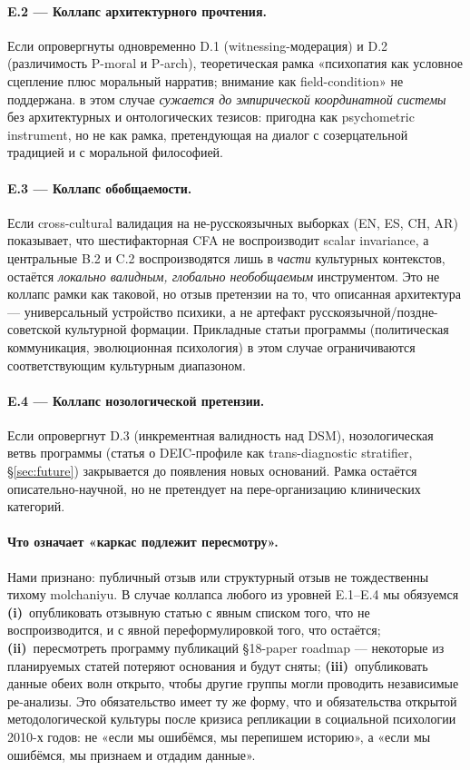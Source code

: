 \paragraph{E.2 --- Коллапс архитектурного прочтения.}
Если опровергнуты одновременно D.1 (witnessing-модерация) и D.2 (различимость P-moral и P-arch), теоретическая рамка «психопатия как условное сцепление плюс моральный нарратив; внимание как field-condition» не поддержана. \DEIC{} в этом случае \emph{сужается до эмпирической координатной системы} без архитектурных и онтологических тезисов: пригодна как psychometric instrument, но не как рамка, претендующая на диалог с созерцательной традицией и с моральной философией.

\paragraph{E.3 --- Коллапс обобщаемости.}
Если cross-cultural валидация на не-русскоязычных выборках (EN, ES, CH, AR) показывает, что шестифакторная CFA не воспроизводит scalar invariance, а центральные B.2 и C.2 воспроизводятся лишь в \emph{части} культурных контекстов, \DEIC{} остаётся \emph{локально валидным, глобально необобщаемым} инструментом. Это не коллапс рамки как таковой, но отзыв претензии на то, что описанная архитектура --- универсальный устройство психики, а не артефакт русскоязычной/поздне-советской культурной формации. Прикладные статьи программы (политическая коммуникация, эволюционная психология) в этом случае ограничиваются соответствующим культурным диапазоном.

\paragraph{E.4 --- Коллапс нозологической претензии.}
Если опровергнут D.3 (инкрементная валидность над DSM), нозологическая ветвь программы (статья о DEIC-профиле как trans-diagnostic stratifier, §\ref{sec:future}) закрывается до появления новых оснований. Рамка остаётся описательно-научной, но не претендует на пере-организацию клинических категорий.

\paragraph{Что означает «каркас подлежит пересмотру».}
Нами признано: публичный отзыв или структурный отзыв не тождественны тихому molchaniyu. В случае коллапса любого из уровней E.1--E.4 мы обязуемся \textbf{(i)}~опубликовать отзывную статью с явным списком того, что не воспроизводится, и с явной переформулировкой того, что остаётся; \textbf{(ii)}~пересмотреть программу публикаций \S18-paper roadmap --- некоторые из планируемых статей потеряют основания и будут сняты; \textbf{(iii)}~опубликовать данные обеих волн открыто, чтобы другие группы могли проводить независимые ре-анализы. Это обязательство имеет ту же форму, что и обязательства открытой методологической культуры после кризиса репликации в социальной психологии 2010-х годов: не «если мы ошибёмся, мы перепишем историю», а «если мы ошибёмся, мы признаем и отдадим данные».

